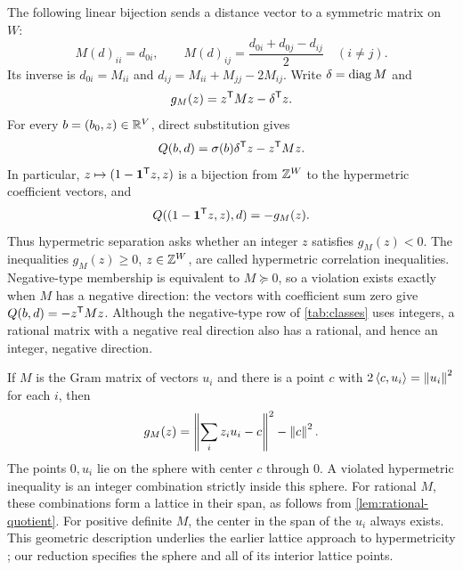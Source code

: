 The following linear bijection sends a distance vector to a symmetric
matrix on $W$:
\begin{equation}\label{eq:M}
 M(d)_{ii}=d_{0i},\qquad
 M(d)_{ij}=\frac{d_{0i}+d_{0j}-d_{ij}}2\quad(i\ne j).
\end{equation}
Its inverse is $d_{0i}=M_{ii}$ and
$d_{ij}=M_{ii}+M_{jj}-2M_{ij}$.  Write $\delta=\operatorname{diag} M$ and
\begin{equation}\label{eq:g}
 g_M(z)=z^{\mathsf T} Mz-\delta^{\mathsf T} z.
\end{equation}
For every $b=(b_0,z)\in\mathbb R^V$, direct substitution gives
\begin{equation}\label{eq:Q-M}
 Q(b,d)=\sigma(b)\delta^{\mathsf T} z-z^{\mathsf T} Mz.
\end{equation}
In particular, $z\mapsto(1-\mathbf 1^{\mathsf T} z,z)$ is a bijection from
$\mathbb Z^W$ to the hypermetric coefficient vectors, and
\begin{equation}\label{eq:hypermetric-g}
 Q((1-\mathbf 1^{\mathsf T} z,z),d)=-g_M(z).
\end{equation}
Thus hypermetric separation asks whether an integer $z$ satisfies
$g_M(z)<0$.  The inequalities $g_M(z)\geq0$, $z\in\mathbb Z^W$, are called
hypermetric correlation inequalities.  Negative-type membership is equivalent to $M\succeq0$,
so a violation exists exactly when $M$ has a negative direction:
the vectors with coefficient sum zero give $Q(b,d)=-z^{\mathsf T} Mz$.
Although the negative-type row of \cref{tab:classes} uses integers,
a rational matrix with a negative real direction also has a rational,
and hence an integer, negative direction.

If $M$ is the Gram matrix of vectors $u_i$ and there is a point $c$ with
$2\left\langle c,u_i\right\rangle=\left\lVert u_i\right\rVert^2$ for each $i$, then
\begin{equation}\label{eq:sphere}
 g_M(z)=\left\lVert \sum_i z_i u_i-c\right\rVert^2-\left\lVert c\right\rVert^2.
\end{equation}
The points $0,u_i$ lie on the sphere with center $c$ through $0$.
A violated hypermetric inequality is an integer combination strictly
inside this sphere.  For rational $M$, these combinations form a
lattice in their span, as follows from \cref{lem:rational-quotient}.
For positive definite $M$, the center in the span of the
$u_i$ always exists.  This geometric description underlies the earlier
lattice approach to hypermetricity \citep{AvisGrishukhin1993}; our
reduction specifies the sphere and all of its interior lattice points.

